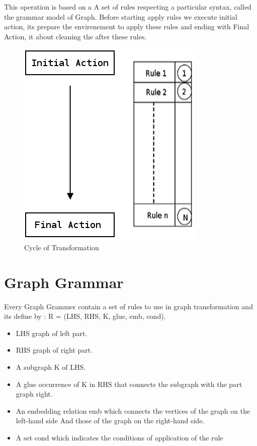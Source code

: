  
This operation is based on a A set of rules respecting a particular 
syntax, called the grammar model of Graph.
Before starting apply rules we execute initial action, 
its prepare the envirenement to apply these rules
and ending with Final Action, it about cleaning the after these rules\cite{ch3-bid, ch3-spec}.
\begin{figure}[th]
	\centering
		\includegraphics[scale=0.52]{ch3/img/transGrammar}
	\caption{\label{fig:Cycle of Tranformation}Cycle of Transformation\cite{ch3-img}}
\end{figure} 
\pagebreak
\section{Graph Grammar} 
Every Graph Grammer contain a set of rules to use in graph transformation
and its define by\cite{ch3-doc, ch3-spec} :
R = (LHS, RHS, K, glue, emb, cond). 
\begin{itemize}
\newcommand{\localtextbulletone}{\textcolor{gray}{\raisebox{.45ex}{\rule{.6ex}{.6ex}}}}
\renewcommand{\labelitemi}{\localtextbulletone}
\item LHS graph of left part.
\item RHS graph of right part.
\item A subgraph K of LHS.
\item A glue occurrence of K in RHS that connects the subgraph with the part graph  right.
\item An embedding relation emb which connects the vertices of the graph on the left-hand side
And those of the graph on the right-hand side.
\item A set cond which indicates the conditions of application of the rule
\end{itemize}

